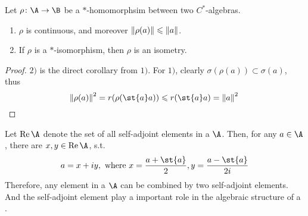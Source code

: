 \begin{prop} \label{prop8}
	Let $\rho \colon \A \sto \B$ be a $*$-homomorphsim between two $C^{*}$-algebras.
	\begin{enumerate}[label=\arabic*)]
		\item $\rho$ is continuous, and moreover $\left\lVert\rho(a)\right\lVert \leqslant \left\lVert a\right\lVert$.
		\item If $\rho$ is a $*$-isomorphism, then $\rho$ is an isometry.
	\end{enumerate}
\end{prop}
\begin{proof}
	$2)$ is the direct corollary from $1)$. For $1)$, clearly $\sigma(\rho(a)) \subset \sigma(a)$, thus
	\begin{equation*}
		\norm{\rho(a)}^{2} = r(\rho(\st{a}a)) \leqslant r(\st{a}a) = \norm{a}^{2} \qedhere
	\end{equation*}
\end{proof}

Let $\Rea{\A}$ denote the set of all self-adjoint elements in a \Cs $\A$. Then, for any $a \in \A$, there are $x,y \in \Rea{\A}$, s.t.
\begin{equation*}
	a = x + iy, \text{ where } x = \frac{a + \st{a}}{2}, y = \frac{a-\st{a}}{2i}
\end{equation*}
Therefore, any element in a \Cs $\A$ can be combined by two self-adjoint elements. And the self-adjoint element play a important role in the algebraic structure of a \Cs. 

